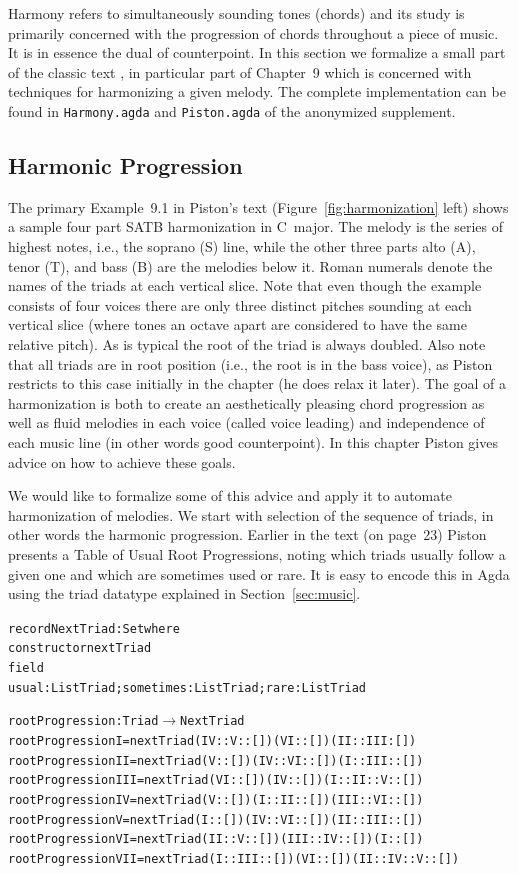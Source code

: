 Harmony refers to simultaneously sounding tones (chords) and its study
is primarily concerned with the progression of chords throughout a
piece of music. It is in essence the dual of counterpoint. In this
section we formalize a small part of the classic text
\citet{piston-harmony}, in particular part of Chapter~9 which is
concerned with techniques for harmonizing a given melody.
The complete implementation can be found in \texttt{Harmony.agda}
and \texttt{Piston.agda} of the anonymized supplement.

\subsection{Harmonic Progression}
\label{sec:harmony:prog}

The primary Example~9.1 in Piston's text
(Figure~\ref{fig:harmonization} left) shows a
sample four part SATB harmonization in C~major. The melody is the
series of highest notes, i.e., the soprano (S) line, while the other three
parts alto (A), tenor (T), and bass (B) are the melodies below
it. Roman numerals denote the names of the triads at each vertical
slice. Note that even though the example consists of four voices there are only
three distinct pitches sounding at each vertical slice (where tones an
octave apart are considered to have the same relative pitch). As is
typical the root of the triad is always doubled. Also note that all
triads are in root position (i.e., the root is in the bass voice),
as Piston restricts to this case initially in the chapter (he does
relax it later). The goal of a harmonization is both to create an
aesthetically pleasing chord progression as well as fluid melodies in
each voice (called voice leading) and independence of each music
line (in other words good counterpoint). In this chapter
Piston gives advice on how to achieve these goals.

\Harmonization

We would like to formalize some of this advice and apply it to
automate harmonization of melodies. We start with selection of the
sequence of triads, in other words the harmonic progression. Earlier
in the text (on page~23) Piston presents a Table of Usual Root
Progressions, noting which triads usually follow a given one and
which are sometimes used or rare. It is easy to encode this in Agda
using the triad datatype explained in Section~\ref{sec:music}.

\begin{alltt}
record NextTriad : Set where
  constructor nextTriad
  field
    usual : List Triad; sometimes : List Triad; rare : List Triad

rootProgression : Triad \(\rightarrow\) NextTriad
rootProgression I   = nextTriad (IV :: V :: []) (VI :: []) (II  :: III : [])
rootProgression II  = nextTriad (V :: []) (IV :: VI :: []) (I :: III :: [])
rootProgression III = nextTriad (VI :: []) (IV :: []) (I :: II :: V :: [])
rootProgression IV  = nextTriad (V :: []) (I :: II :: []) (III :: VI :: [])
rootProgression V   = nextTriad (I :: []) (IV :: VI :: []) (II :: III :: [])
rootProgression VI  = nextTriad (II :: V :: []) (III :: IV :: []) (I :: [])
rootProgression VII = nextTriad (I  :: III :: []) (VI :: []) (II :: IV  :: V :: [])
\end{alltt}

